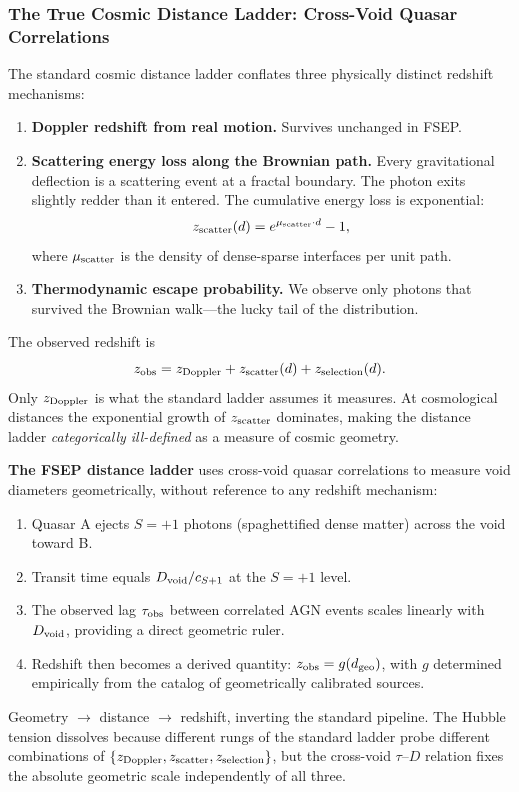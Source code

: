 \documentclass[11pt,letterpaper]{article}
\begin{document}
\subsubsection{The True Cosmic Distance Ladder: Cross-Void Quasar Correlations}
The standard cosmic distance ladder conflates three physically distinct redshift
mechanisms:
\begin{enumerate}
\item \textbf{Doppler redshift from real motion.} Survives unchanged in FSEP.
\item \textbf{Scattering energy loss along the Brownian path.} Every gravitational
    deflection is a scattering event at a fractal boundary. The photon exits
    slightly redder than it entered. The cumulative energy loss is exponential:
\begin{equation}
z_{\rm scatter}(d)=e^{\mu_{\rm scatter}\cdot d}-1,
\end{equation}
where $\mu_{\rm scatter}$ is the density of dense-sparse interfaces per unit path.
\item \textbf{Thermodynamic escape probability.} We observe only photons that
    survived the Brownian walk---the lucky tail of the distribution.
\end{enumerate}
The observed redshift is
\begin{equation}
z_{\rm obs}=z_{\rm Doppler}+z_{\rm scatter}(d)+z_{\rm selection}(d).
\end{equation}
Only $z_{\rm Doppler}$ is what the standard ladder assumes it measures. At
cosmological distances the exponential growth of $z_{\rm scatter}$ dominates,
making the distance ladder \textit{categorically ill-defined} as a measure of
cosmic geometry.

\textbf{The FSEP distance ladder} uses cross-void quasar correlations to measure
void diameters geometrically, without reference to any redshift mechanism:
\begin{enumerate}
\item Quasar A ejects $S{=}+1$ photons (spaghettified dense matter) across the
    void toward B.
\item Transit time equals $D_{\rm void}/c_{S+1}$ at the $S{=}+1$ level.
\item The observed lag $\tau_{\rm obs}$ between correlated AGN events scales
    linearly with $D_{\rm void}$, providing a direct geometric ruler.
\item Redshift then becomes a derived quantity: $z_{\rm obs}=g(d_{\rm geo})$,
    with $g$ determined empirically from the catalog of geometrically calibrated
    sources.
\end{enumerate}
Geometry $\to$ distance $\to$ redshift, inverting the standard pipeline. The Hubble
tension dissolves because different rungs of the standard ladder probe different
combinations of $\{z_{\rm Doppler}, z_{\rm scatter}, z_{\rm selection}\}$, but the
cross-void $\tau$--$D$ relation fixes the absolute geometric scale independently
of all three.
\end{document}
